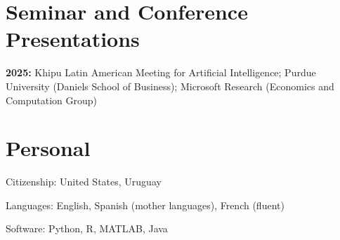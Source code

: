 \documentclass[11pt,reqno]{amsart}
\begin{document}
\section*{Seminar and Conference Presentations}
\textbf{2025:} Khipu Latin American Meeting for Artificial Intelligence; Purdue University (Daniels School of Business); Microsoft Research (Economics and Computation Group)

\section*{Personal}
Citizenship: United States, Uruguay

Languages: English, Spanish (mother languages), French (fluent)

Software: Python, R, MATLAB, Java
\end{document}
